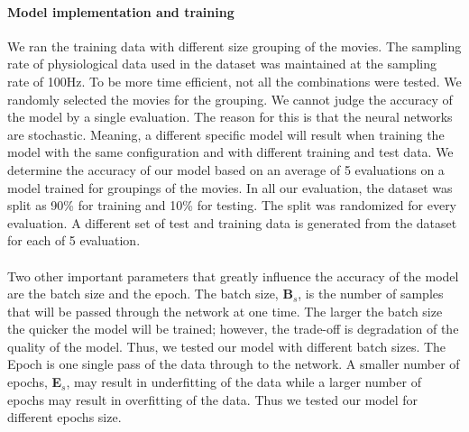 \paragraph{Model implementation and training} We ran the training data with different size grouping of the movies. The sampling rate of physiological data used in the dataset was maintained at the sampling rate of 100Hz. To be more time efficient, not all the combinations were tested. We randomly selected the movies for the grouping. We cannot judge the accuracy of the model by a single evaluation. The reason for this is that the neural networks are stochastic. Meaning, a different specific model will result when training the model with the same configuration and with different training and test data. We determine the accuracy of our model based on an average of 5 evaluations on a model trained for groupings of the movies. In all our evaluation, the dataset was split as 90\% for training and 10\% for testing. The split was randomized for every evaluation. A different set of test and training data is generated from the dataset for each of 5 evaluation.

\paragraph{} Two other important parameters that greatly influence the accuracy of the model are the batch size and the epoch. The batch size, \textbf{B$_{s}$}, is the number of samples that will be passed through the network at one time. The larger the batch size the quicker the model will be trained; however, the trade-off is degradation of the quality of the model. Thus, we tested our model with different batch sizes. The Epoch is one single pass of the data through to the network. A smaller number of epochs, \textbf{E$_{s}$}, may result in underfitting of the data while a larger number of epochs may result in overfitting of the data. Thus we tested our model for different epochs size.


